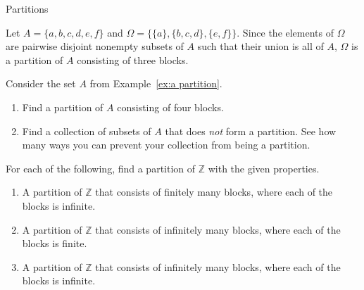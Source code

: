 \begin{section}{Partitions}

\begin{example}\label{ex:a partition}
Let $A=\{a,b,c,d,e,f\}$ and $\Omega=\{\{a\}, \{b,c,d\}, \{e,f\}\}$. Since the elements of $\Omega$ are pairwise disjoint nonempty subsets of $A$ such that their union is all of $A$, $\Omega$ is a partition of $A$ consisting of three blocks.
\end{example}

\begin{problem}
Consider the set $A$ from Example~\ref{ex:a partition}.
\begin{enumerate}[label=\textrm{(\alph*)}]
\item Find a partition of $A$ consisting of four blocks.
\item Find a collection of subsets of $A$ that does \emph{not} form a partition. See how many ways you can prevent your collection from being a partition.
\end{enumerate}
\end{problem}



\begin{problem}
For each of the following, find a partition of $\mathbb{Z}$ with the given properties.
\begin{enumerate}[label=\textrm{(\alph*)}]
\item A partition of $\mathbb{Z}$ that consists of finitely many blocks, where each of the blocks is infinite.
\item A partition of $\mathbb{Z}$ that consists of infinitely many blocks, where each of the blocks is finite.
\item A partition of $\mathbb{Z}$ that consists of infinitely many blocks, where each of the blocks is infinite.
\end{enumerate}
\end{problem}


\end{section}
